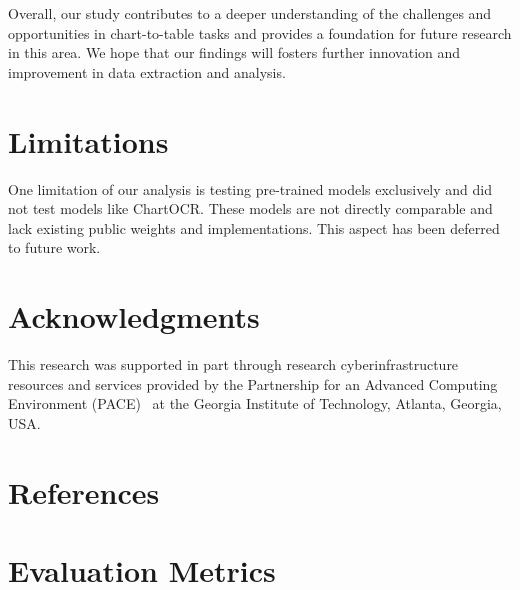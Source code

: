 \documentclass[
	letterpaper, %
]{jdf}
\begin{document}
Overall, our study contributes to a deeper understanding of the challenges and opportunities in chart-to-table tasks and provides a foundation for future research in this area. 
We hope that our findings will fosters further innovation and improvement in data extraction and analysis.

\section{Limitations}\label{sect:limitations}
One limitation of our analysis is testing pre-trained models exclusively and did not test models like ChartOCR.
These models are not directly comparable and lack existing public weights and implementations.
This aspect has been deferred to future work.

\section{Acknowledgments}
This research was supported in part through research cyberinfrastructure resources and services provided by the Partnership for an Advanced Computing Environment (PACE)~\cite{pace2017partnership} at the Georgia Institute of Technology, Atlanta, Georgia, USA.

\section{References}
\printbibliography[heading=none]

\appendix
\section{Evaluation Metrics}\label{app:metrics}
\end{document}
